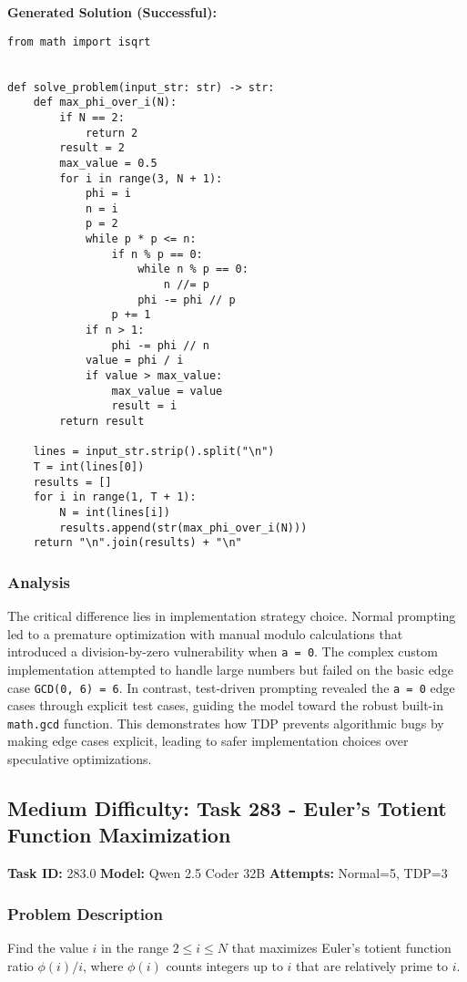 \documentclass{article}
\begin{document}
\textbf{Generated Solution (Successful):}
\begin{lstlisting}
from math import isqrt


def solve_problem(input_str: str) -> str:
    def max_phi_over_i(N):
        if N == 2:
            return 2
        result = 2
        max_value = 0.5
        for i in range(3, N + 1):
            phi = i
            n = i
            p = 2
            while p * p <= n:
                if n % p == 0:
                    while n % p == 0:
                        n //= p
                    phi -= phi // p
                p += 1
            if n > 1:
                phi -= phi // n
            value = phi / i
            if value > max_value:
                max_value = value
                result = i
        return result

    lines = input_str.strip().split("\n")
    T = int(lines[0])
    results = []
    for i in range(1, T + 1):
        N = int(lines[i])
        results.append(str(max_phi_over_i(N)))
    return "\n".join(results) + "\n"
\end{lstlisting}

\subsubsection{Analysis}

The critical difference lies in implementation strategy choice. Normal prompting led to a premature optimization with manual modulo calculations that introduced a division-by-zero vulnerability when \texttt{a = 0}. The complex custom implementation attempted to handle large numbers but failed on the basic edge case \texttt{GCD(0, 6) = 6}. In contrast, test-driven prompting revealed the \texttt{a = 0} edge cases through explicit test cases, guiding the model toward the robust built-in \texttt{math.gcd} function. This demonstrates how TDP prevents algorithmic bugs by making edge cases explicit, leading to safer implementation choices over speculative optimizations.

\subsection{Medium Difficulty: Task 283 - Euler's Totient Function Maximization}
\label{appendix:task283}

\noindent \textbf{Task ID:} 283.0 \quad \textbf{Model:} Qwen 2.5 Coder 32B \quad \textbf{Attempts:} Normal=5, TDP=3

\subsubsection{Problem Description}
Find the value $i$ in the range $2 \leq i \leq N$ that maximizes Euler's totient function ratio $\phi(i)/i$, where $\phi(i)$ counts integers up to $i$ that are relatively prime to $i$.
\end{document}
